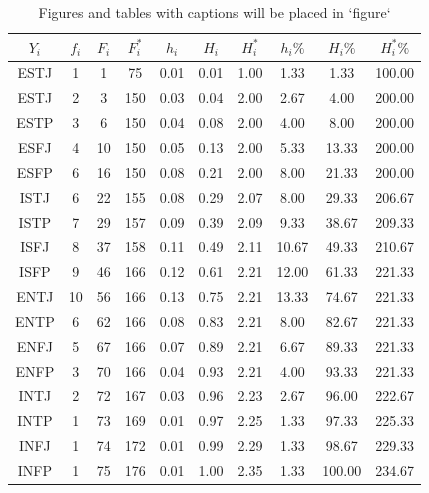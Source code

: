 \documentclass[10pt,]{krantz}
\theoremstyle{definition}
\theoremstyle{definition}
\theoremstyle{definition}
\theoremstyle{definition}
\theoremstyle{remark}
\begin{document}
\begin{longtable}[t]{cccccccccc}
\caption{\label{tab:2w3}Figures and tables with captions will be placed in `figure` }\\
\toprule
$Y_i$ & $f_i$ & $F_i$ & $F_i^*$ & $h_i$ & $H_i$ & $H_i^*$ & $h_i\%$ & $H_i\%$ & $H_i^*\%$\\
\midrule
ESTJ & 1 & 1 & 75 & 0.01 & 0.01 & 1.00 & 1.33 & 1.33 & 100.00\\
ESTJ & 2 & 3 & 150 & 0.03 & 0.04 & 2.00 & 2.67 & 4.00 & 200.00\\
ESTP & 3 & 6 & 150 & 0.04 & 0.08 & 2.00 & 4.00 & 8.00 & 200.00\\
ESFJ & 4 & 10 & 150 & 0.05 & 0.13 & 2.00 & 5.33 & 13.33 & 200.00\\
ESFP & 6 & 16 & 150 & 0.08 & 0.21 & 2.00 & 8.00 & 21.33 & 200.00\\
ISTJ & 6 & 22 & 155 & 0.08 & 0.29 & 2.07 & 8.00 & 29.33 & 206.67\\
ISTP & 7 & 29 & 157 & 0.09 & 0.39 & 2.09 & 9.33 & 38.67 & 209.33\\
ISFJ & 8 & 37 & 158 & 0.11 & 0.49 & 2.11 & 10.67 & 49.33 & 210.67\\
ISFP & 9 & 46 & 166 & 0.12 & 0.61 & 2.21 & 12.00 & 61.33 & 221.33\\
ENTJ & 10 & 56 & 166 & 0.13 & 0.75 & 2.21 & 13.33 & 74.67 & 221.33\\
ENTP & 6 & 62 & 166 & 0.08 & 0.83 & 2.21 & 8.00 & 82.67 & 221.33\\
ENFJ & 5 & 67 & 166 & 0.07 & 0.89 & 2.21 & 6.67 & 89.33 & 221.33\\
ENFP & 3 & 70 & 166 & 0.04 & 0.93 & 2.21 & 4.00 & 93.33 & 221.33\\
INTJ & 2 & 72 & 167 & 0.03 & 0.96 & 2.23 & 2.67 & 96.00 & 222.67\\
INTP & 1 & 73 & 169 & 0.01 & 0.97 & 2.25 & 1.33 & 97.33 & 225.33\\
INFJ & 1 & 74 & 172 & 0.01 & 0.99 & 2.29 & 1.33 & 98.67 & 229.33\\
INFP & 1 & 75 & 176 & 0.01 & 1.00 & 2.35 & 1.33 & 100.00 & 234.67\\
\bottomrule
\end{longtable}



\printindex
\end{document}

